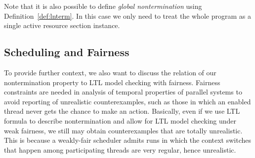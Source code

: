 % 


Note that it is also possible to define \emph{global nontermination} using
Definition~\ref{def:lnterm}. In this case we only need to treat the whole
program as a single active resource section instance.



\subsection{Scheduling and Fairness} \label{sec:fairness}

To provide further context, we also want to discuss the relation of our
nontermination property to LTL model checking with fairness.  Fairness
constraints \cite[Chapter 3.5]{PoMC} are needed in analysis of temporal
properties of parallel systems to avoid reporting of unrealistic
counterexamples, such as those in which an enabled thread never gets the chance
to make an action. Basically, even if we use LTL formula to
describe nontermination and allow for LTL model checking under weak fairness, we
still may obtain counterexamples that are totally unrealistic. This is because a
weakly-fair scheduler\footnotemark{} admits runs in which the context switches that happen
among participating threads are very regular, hence unrealistic.

